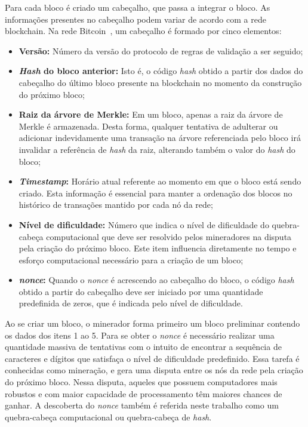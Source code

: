 Para cada bloco é criado um cabeçalho, que passa a integrar o bloco. As informações presentes no cabeçalho podem variar de acordo com a rede blockchain. Na rede Bitcoin~\cite{overview-bitcoin2008nakamoto}, um cabeçalho é formado por cinco elementos:
\begin{itemize}
    \item \textbf{Versão:} Número da versão do protocolo de regras de validação a ser seguido; 
    \item \textbf{\textit{Hash} do bloco anterior:} Isto é, o código \textit{hash} obtido a partir dos dados do cabeçalho do último bloco presente na blockchain no momento da construção do próximo bloco;
    \item \textbf{Raiz da árvore de Merkle:} Em um bloco, apenas a raiz da árvore de Merkle é armazenada. Desta forma, qualquer tentativa de adulterar ou adicionar indevidamente uma transação na árvore referenciada pelo bloco irá invalidar a referência de \textit{hash} da raiz, alterando também o valor do \textit{hash} do bloco;
    \item \textbf{\textit{Timestamp}:} Horário atual referente ao momento em que o bloco está sendo criado. Esta informação é essencial para manter a ordenação dos blocos no histórico de transações mantido por cada nó da rede;
    \item \textbf{Nível de dificuldade:} Número que indica o nível de dificuldade do quebra-cabeça computacional que deve ser resolvido pelos mineradores na disputa pela criação do próximo bloco. Este item influencia diretamente no tempo e esforço computacional necessário para a criação de um bloco;
    \item \textbf{\textit{nonce}:} Quando o \textit{nonce} é acrescendo ao cabeçalho do bloco, o código \textit{hash} obtido a partir do cabeçalho deve ser iniciado por uma quantidade predefinida de zeros, que é indicada pelo nível de dificuldade. 
\end{itemize}


Ao se criar um bloco, o minerador forma primeiro um bloco preliminar contendo os dados dos itens 1 ao 5. Para se obter o \textit{nonce} é necessário realizar uma quantidade massiva de tentativas com o intuito de encontrar a sequência de caracteres e dígitos que satisfaça o nível de dificuldade predefinido. Essa tarefa é conhecidas como mineração, e gera uma disputa entre os nós da rede pela criação do próximo bloco. Nessa disputa, aqueles que possuem computadores mais robustos e com maior capacidade de processamento têm maiores chances de ganhar. A descoberta do \textit{nonce} também é referida neste trabalho como um quebra-cabeça computacional ou quebra-cabeça de \textit{hash}. 

